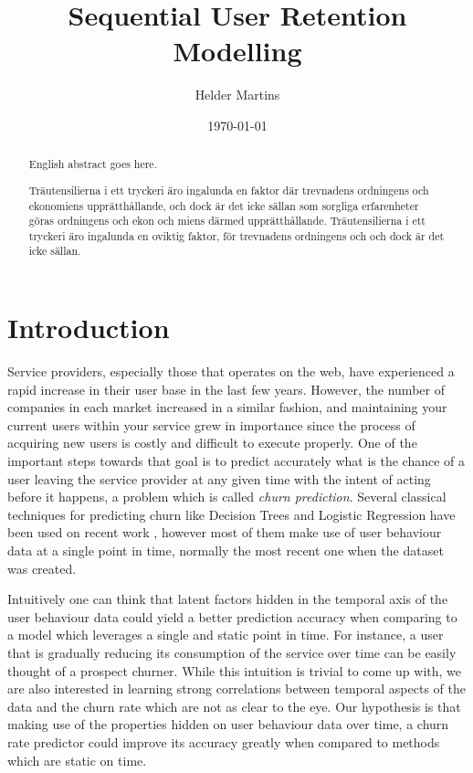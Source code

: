 \documentclass{kththesis}
\title{Sequential User Retention Modelling}
\author{Helder Martins}
\date{\today}
\begin{document}
\flyleaf

\begin{abstract}
  English abstract goes here.
  \lipsum[1-2]
\end{abstract}

\clearpage

\begin{otherlanguage}{swedish}
  \begin{abstract}
    Träutensilierna i ett tryckeri äro ingalunda en faktor där
    trevnadens ordningens och ekonomiens upprätthållande, och dock är
    det icke sällan som sorgliga erfarenheter göras ordningens och
    ekon och miens därmed upprätthållande. Träutensilierna i ett
    tryckeri äro ingalunda en oviktig faktor, för trevnadens
    ordningens och och dock är det icke sällan.
  \end{abstract}
\end{otherlanguage}

\cleardoublepage

\tableofcontents


\mainmatter


\chapter{Introduction}

    Service providers, especially those that operates on the web, have experienced a rapid increase in their user base in the last few years. However, the number of companies in each market increased in a similar fashion, and maintaining your current users within your service grew in importance since the process of acquiring new users is costly and difficult to execute properly. One of the important steps towards that goal is to predict accurately what is the chance of a user leaving the service provider at any given time with the intent of acting before it happens, a problem which is called \emph{churn prediction}. Several classical techniques for predicting churn like Decision Trees and Logistic Regression have been used on recent work \cite{Lazarov2007}, however most of them make use of user behaviour data at a single point in time, normally the most recent one when the dataset was created. 
    
    Intuitively one can think that latent factors hidden in the temporal axis of the user behaviour data could yield a better prediction accuracy when comparing to a model which leverages a single and static point in time. For instance, a user that is gradually reducing its consumption of the service over time can be easily thought of a prospect churner. While this intuition is trivial to come up with, we are also interested in learning strong correlations between temporal aspects of the data and the churn rate which are not as clear to the eye. Our hypothesis is that making use of the properties hidden on user behaviour data over time, a churn rate predictor could improve its accuracy greatly when compared to methods which are static on time.
    
\end{document}
